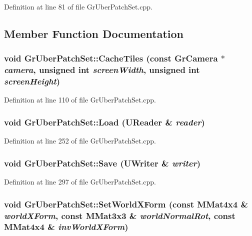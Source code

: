Definition at line 81 of file GrUberPatchSet.cpp.

\subsection{Member Function Documentation}
\hypertarget{class_gr_uber_patch_set_bec24bb077003d70bb235500a3dfb43d}{
\subsubsection[{CacheTiles}]{\setlength{\rightskip}{0pt plus 5cm}void GrUberPatchSet::CacheTiles (const {\bf GrCamera} $\ast$ {\em camera}, \/  unsigned int {\em screenWidth}, \/  unsigned int {\em screenHeight})}}
\label{class_gr_uber_patch_set_bec24bb077003d70bb235500a3dfb43d}




Definition at line 110 of file GrUberPatchSet.cpp.\hypertarget{class_gr_uber_patch_set_4ab7aa5b16b09be6984c3b3b9c1307f0}{
\subsubsection[{Load}]{\setlength{\rightskip}{0pt plus 5cm}void GrUberPatchSet::Load ({\bf UReader} \& {\em reader})}}
\label{class_gr_uber_patch_set_4ab7aa5b16b09be6984c3b3b9c1307f0}




Definition at line 252 of file GrUberPatchSet.cpp.\hypertarget{class_gr_uber_patch_set_53a1e10a947e715bd18568b138d53501}{
\subsubsection[{Save}]{\setlength{\rightskip}{0pt plus 5cm}void GrUberPatchSet::Save ({\bf UWriter} \& {\em writer})}}
\label{class_gr_uber_patch_set_53a1e10a947e715bd18568b138d53501}




Definition at line 297 of file GrUberPatchSet.cpp.\hypertarget{class_gr_uber_patch_set_6feafbdd216ce949255d0e0979b426d4}{
\subsubsection[{SetWorldXForm}]{\setlength{\rightskip}{0pt plus 5cm}void GrUberPatchSet::SetWorldXForm (const {\bf MMat4x4} \& {\em worldXForm}, \/  const {\bf MMat3x3} \& {\em worldNormalRot}, \/  const {\bf MMat4x4} \& {\em invWorldXForm})}}
\label{class_gr_uber_patch_set_6feafbdd216ce949255d0e0979b426d4}




